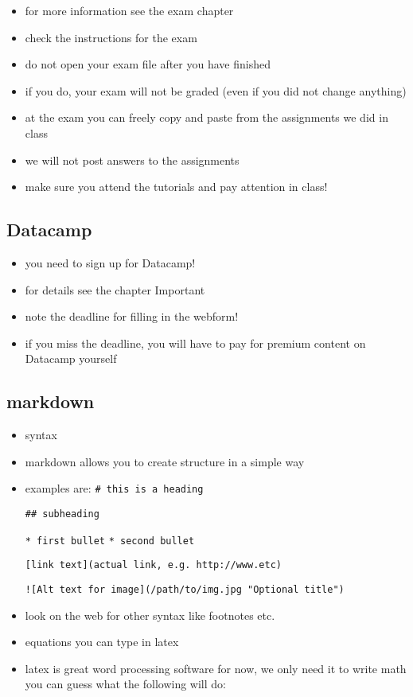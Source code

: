 \documentclass[]{book}
\providecommand{\tightlist}{%
  \setlength{\itemsep}{0pt}\setlength{\parskip}{0pt}}
\begin{document}
\begin{itemize}
\tightlist
\item
  for more information see the exam chapter
\item
  check the instructions for the exam
\item
  do not open your exam file after you have finished
\item
  if you do, your exam will not be graded (even if you did not change anything)
\item
  at the exam you can freely copy and paste from the assignments we did in class
\item
  we will not post answers to the assignments
\item
  make sure you attend the tutorials and pay attention in class!
\end{itemize}

\hypertarget{datacamp-1}{%
\subsection{Datacamp}\label{datacamp-1}}

\begin{itemize}
\tightlist
\item
  you need to sign up for Datacamp!
\item
  for details see the chapter Important
\item
  note the deadline for filling in the webform!
\item
  if you miss the deadline, you will have to pay for premium content on Datacamp yourself
\end{itemize}

\hypertarget{markdown}{%
\subsection{markdown}\label{markdown}}

\begin{itemize}
\item
  syntax
\item
  markdown allows you to create structure in a simple way
\item
  examples are:
  \texttt{\#\ this\ is\ a\ heading}

  \texttt{\#\#\ subheading}

  \texttt{*\ first\ bullet}
  \texttt{*\ second\ bullet}

  \texttt{{[}link\ text{]}(actual\ link,\ e.g.\ http://www.etc)}

  \texttt{!{[}Alt\ text\ for\ image{]}(/path/to/img.jpg\ "Optional\ title")}
\item
  look on the web for other syntax like footnotes etc.
\item
  equations you can type in latex
\item
  latex is great word processing software
  for now, we only need it to write math
  you can guess what the following will do:
\end{itemize}
\end{document}
